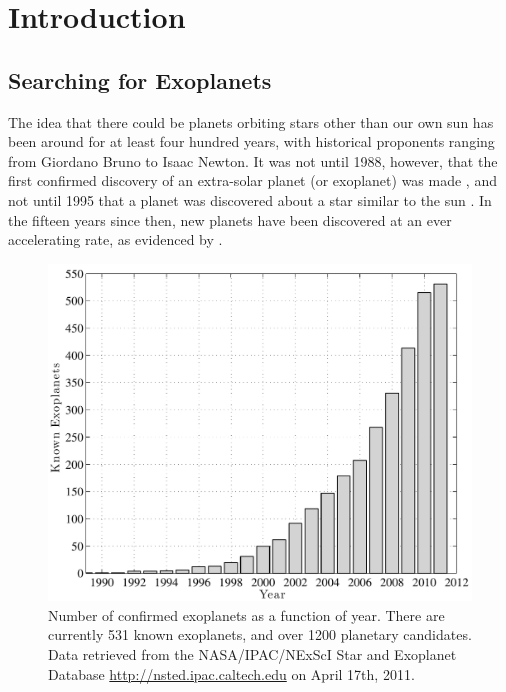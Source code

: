 \chapter{Introduction}\label{ch:intro}

\section{Searching for Exoplanets}\label{sec:ch1_background}
The idea that there could be planets orbiting stars other than our own sun has been around for at least four hundred years, with historical proponents ranging from Giordano Bruno to Isaac Newton.  It was not until 1988, however, that the first confirmed discovery of an extra-solar planet (or exoplanet) was made \citet{campbell1988search}, and not until 1995 that a planet was discovered about a star similar to the sun \citet{mayor1995jupiter}.  In the fifteen years since then, new planets have been discovered at an ever accelerating rate, as evidenced by .
\begin{figure}[ht]
 \center
 \includegraphics[width=5.5in]{./figures/planDiscHist}
  \caption[History of exoplanet discovery]{ \label{fig:planDiscHist} Number of confirmed exoplanets as a function of year.  There are currently 531 known exoplanets, and over 1200 planetary candidates.  Data retrieved from the NASA/IPAC/NExScI Star and Exoplanet Database \url{http://nsted.ipac.caltech.edu} on April 17th, 2011.}
\end{figure} 

